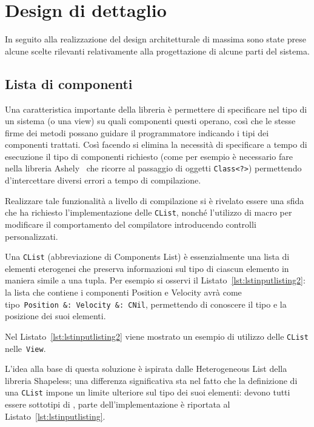 \chapter{Design di dettaglio}\label{ch:design-di-dettaglio}
In seguito alla realizzazione del design architetturale di massima sono state prese
alcune scelte rilevanti relativamente alla progettazione di alcune parti del sistema.

\section{Lista di componenti}\label{sec:lista-di-componenti}
Una caratteristica importante della libreria è permettere di specificare nel tipo di un sistema (o una view)
su quali componenti questi operano, così che le stesse firme dei metodi possano guidare il programmatore indicando i
tipi dei componenti trattati.
Così facendo si elimina la necessità di specificare a tempo di esecuzione il tipo di componenti richiesto (come per
esempio è necessario fare nella libreria Ashely~\cite{ashley} che ricorre al passaggio di oggetti \texttt{Class<?>})
permettendo d'intercettare diversi errori a tempo di compilazione.

Realizzare tale funzionalità a livello di compilazione si è rivelato essere una sfida che ha richiesto l’implementazione
delle \texttt{CList}, nonché l’utilizzo di macro per modificare il comportamento del compilatore introducendo controlli
personalizzati.

Una \texttt{CList} (abbreviazione di Components List) è essenzialmente una lista di elementi eterogenei che preserva
informazioni sul tipo di ciascun elemento in maniera simile a una tupla.
Per esempio si osservi il Listato~\ref{lst:lstinputlisting2}: la lista che contiene
i componenti Position e Velocity avrà come tipo~\texttt{Position~\&:~Velocity~\&:~CNil}, permettendo di conoscere il
tipo e la posizione dei suoi elementi.

Nel Listato~\ref{lst:lstinputlisting2} viene mostrato un esempio di utilizzo delle \texttt{CList} nelle~\texttt{View}.


L’idea alla base di questa soluzione è ispirata dalle Heterogeneous List della libreria
Shapeless\cite{shapeless}; una differenza significativa sta nel fatto che la definizione di una \texttt{CList} impone un
limite ulteriore sul tipo dei suoi elementi: devono tutti essere sottotipi di \Component, parte dell’implementazione è
riportata al Listato~\ref{lst:lstinputlisting}.

